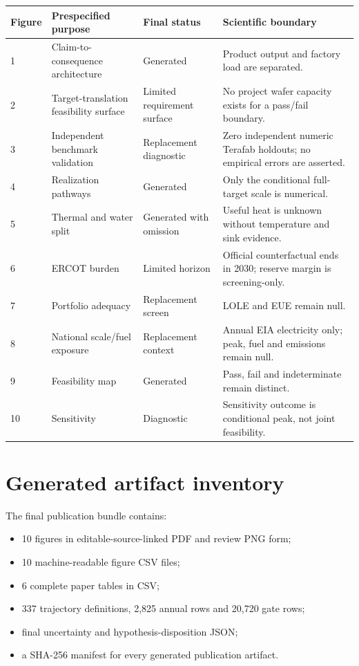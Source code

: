 \documentclass[11pt]{article}
\begin{document}
\begin{longtable}{p{}p{}p{}p{}}
\toprule
Figure & Prespecified purpose & Final status & Scientific boundary \\
\midrule
1 & Claim-to-consequence architecture & Generated & Product output and factory load are separated. \\
2 & Target-translation feasibility surface & Limited requirement surface & No project wafer capacity exists for a pass/fail boundary. \\
3 & Independent benchmark validation & Replacement diagnostic & Zero independent numeric Terafab holdouts; no empirical errors are asserted. \\
4 & Realization pathways & Generated & Only the conditional full-target scale is numerical. \\
5 & Thermal and water split & Generated with omission & Useful heat is unknown without temperature and sink evidence. \\
6 & ERCOT burden & Limited horizon & Official counterfactual ends in 2030; reserve margin is screening-only. \\
7 & Portfolio adequacy & Replacement screen & LOLE and EUE remain null. \\
8 & National scale/fuel exposure & Replacement context & Annual EIA electricity only; peak, fuel and emissions remain null. \\
9 & Feasibility map & Generated & Pass, fail and indeterminate remain distinct. \\
10 & Sensitivity & Diagnostic & Sensitivity outcome is conditional peak, not joint feasibility. \\
\bottomrule
\end{longtable}

\section{Generated artifact inventory}

The final publication bundle contains:

\begin{itemize}
\item 10 figures in editable-source-linked PDF and review PNG form;
\item 10 machine-readable figure CSV files;
\item 6 complete paper tables in CSV;
\item 337 trajectory definitions, 2,825 annual rows and 20,720 gate rows;
\item final uncertainty and hypothesis-disposition JSON;
\item a SHA-256 manifest for every generated publication artifact.
\end{itemize}
\end{document}
